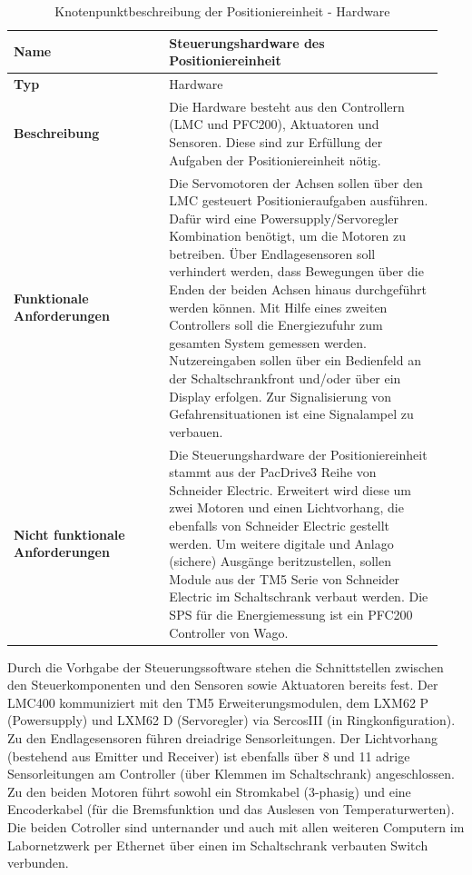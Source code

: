 \documentclass[../Bachelorarbeit.tex]{subfiles}
\begin{document}
\begin{table}[H]
    \centering
    \begin{tabular}{| p{0.34\linewidth} | p{0.6\linewidth} |}
        \hline
        \textbf{Name} & Steuerungshardware des Positioniereinheit \\ \hline
        \textbf{Typ} & Hardware \\ \hline
        \textbf{Beschreibung} & Die Hardware besteht aus den Controllern (LMC und PFC200), Aktuatoren und Sensoren. Diese sind zur Erfüllung der Aufgaben der Positioniereinheit nötig. \\ \hline
        \textbf{Funktionale Anforderungen} & Die Servomotoren der Achsen sollen über den LMC gesteuert Positionieraufgaben ausführen. Dafür wird eine Powersupply/Servoregler Kombination benötigt, um die Motoren zu betreiben. Über Endlagesensoren soll verhindert werden, dass Bewegungen über die Enden der beiden Achsen hinaus durchgeführt werden können. Mit Hilfe eines zweiten Controllers soll die Energiezufuhr zum gesamten System gemessen werden. Nutzereingaben sollen über ein Bedienfeld an der Schaltschrankfront und/oder über ein Display erfolgen. Zur Signalisierung von Gefahrensituationen ist eine Signalampel zu verbauen. \\ \hline
        \textbf{Nicht funktionale Anforderungen} & Die Steuerungshardware der Positioniereinheit stammt aus der PacDrive3 Reihe von Schneider Electric. Erweitert wird diese um zwei Motoren und einen Lichtvorhang, die ebenfalls von Schneider Electric gestellt werden. Um weitere digitale und Anlago (sichere) Ausgänge beritzustellen, sollen Module aus der TM5 Serie von Schneider Electric im Schaltschrank verbaut werden. Die SPS für die Energiemessung ist ein PFC200 Controller von Wago. \\ \hline
    \end{tabular}
    \caption[Knotenpunktbeschreibung - Hardware]{Knotenpunktbeschreibung der Positioniereinheit - Hardware}
    \label{tab:my-table51}
\end{table}

Durch die Vorhgabe der Steuerungssoftware stehen die Schnittstellen zwischen den Steuerkomponenten und den Sensoren sowie Aktuatoren bereits fest. Der LMC400 kommuniziert mit den TM5 Erweiterungsmodulen, dem LXM62 P (Powersupply) und LXM62 D (Servoregler) via SercosIII (in Ringkonfiguration). Zu den Endlagesensoren führen dreiadrige Sensorleitungen. Der Lichtvorhang (bestehend aus Emitter und Receiver) ist ebenfalls über 8 und 11 adrige Sensorleitungen am Controller (über Klemmen im Schaltschrank) angeschlossen. Zu den beiden Motoren führt sowohl ein Stromkabel (3-phasig) und eine Encoderkabel (für die Bremsfunktion und das Auslesen von \zB Temperaturwerten). Die beiden Cotroller sind unternander und auch mit allen weiteren Computern im Labornetzwerk per Ethernet über einen im Schaltschrank verbauten Switch verbunden.
\end{document}

